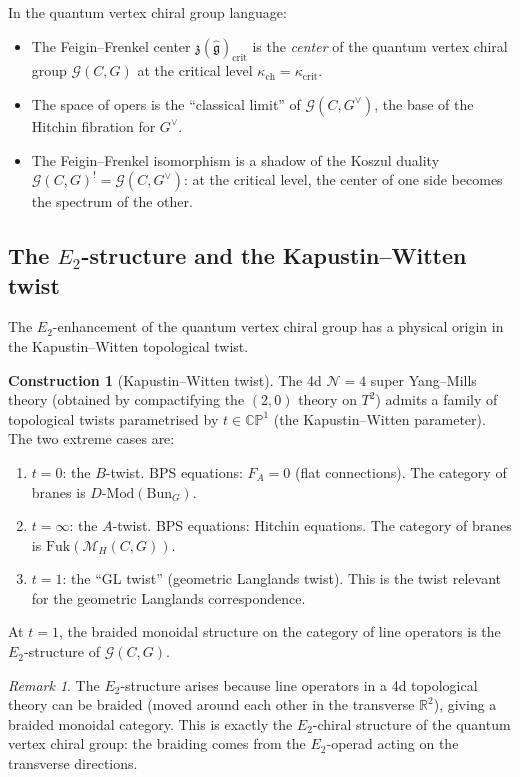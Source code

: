 \documentclass[11pt]{article}
\theoremstyle{definition}
\newtheorem{construction}[theorem]{Construction}
\theoremstyle{remark}
\newtheorem{remark}[theorem]{Remark}
\newcommand{\Bun}{\mathrm{Bun}}
\newcommand{\Fuk}{\mathrm{Fuk}}
\newcommand{\Mod}{\mathrm{Mod}}
\newcommand{\frakg}{\mathfrak{g}}
\newcommand{\cM}{\mathcal{M}}
\newcommand{\cN}{\mathcal{N}}
\newcommand{\Etwo}{E_2}
\begin{document}
In the quantum vertex chiral group language:
\begin{itemize}
 \item The Feigin--Frenkel center $\mathfrak{z}(\widehat{\frakg})_{\mathrm{crit}}$ is the \emph{center} of the quantum vertex chiral group $\mathcal{G}(C, G)$ at the critical level $\kappa_{\mathrm{ch}} = \kappa_{\mathrm{crit}}$.
 \item The space of opers is the ``classical limit'' of $\mathcal{G}(C, G^\vee)$, the base of the Hitchin fibration for $G^\vee$.
 \item The Feigin--Frenkel isomorphism is a shadow of the Koszul duality $\mathcal{G}(C, G)^! = \mathcal{G}(C, G^\vee)$: at the critical level, the center of one side becomes the spectrum of the other.
\end{itemize}

\subsection{The $\Etwo$-structure and the Kapustin--Witten twist}

The $\Etwo$-enhancement of the quantum vertex chiral group has a physical origin in the Kapustin--Witten topological twist.

\begin{construction}[Kapustin--Witten twist]
\label{constr:kw-twist}
The 4d $\cN = 4$ super Yang--Mills theory (obtained by compactifying the $(2,0)$ theory on $T^2$) admits a family of topological twists parametrised by $t \in \mathbb{CP}^1$ (the Kapustin--Witten parameter). The two extreme cases are:
\begin{enumerate}[label=(\roman*)]
 \item $t = 0$: the $B$-twist. BPS equations: $F_A = 0$ (flat connections). The category of branes is $D$-$\Mod(\Bun_G)$.
 \item $t = \infty$: the $A$-twist. BPS equations: Hitchin equations. The category of branes is $\Fuk(\cM_H(C, G))$.
 \item $t = 1$: the ``GL twist'' (geometric Langlands twist). This is the twist relevant for the geometric Langlands correspondence.
\end{enumerate}
At $t = 1$, the braided monoidal structure on the category of line operators is the $\Etwo$-structure of $\mathcal{G}(C, G)$.
\end{construction}

\begin{remark}
\label{rem:e2-from-4d}
The $\Etwo$-structure arises because line operators in a 4d topological theory can be braided (moved around each other in the transverse $\mathbb{R}^2$), giving a braided monoidal category. This is exactly the $\Etwo$-chiral structure of the quantum vertex chiral group: the braiding comes from the $\Etwo$-operad acting on the transverse directions.
\end{remark}
\end{document}
